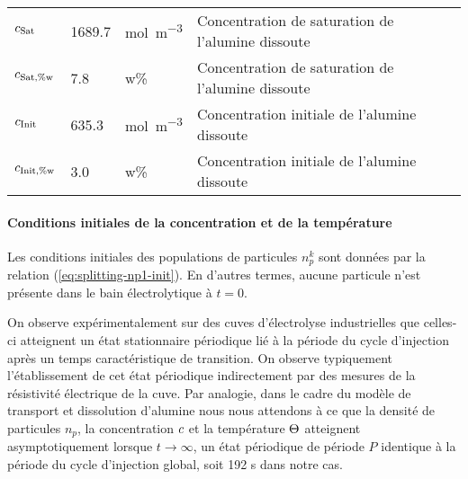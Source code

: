 \begin{table}
\begin{center}
\begin{tabularx}{\textwidth}{@{}lllX@{}}
      $c_\text{Sat}$                               & \num{1689.7}        & \si{\mol\per\cubic\meter}            & Concentration de saturation de l'alumine dissoute               \\
      $c_{\text{Sat},\%\mathrm w}$                             & \num{7.8}           & w\%                                  & Concentration de saturation de l'alumine dissoute               \\
      $c_\text{Init}$                              & \num{635.3}         & \si{\mol\per\cubic\meter}            & Concentration initiale de l'alumine dissoute                    \\
      $c_{\text{Init},\%\mathrm w}$                            & \num{3.0}           & w\%                                  & Concentration initiale de l'alumine dissoute                    \\
      \bottomrule
    \end{tabularx}
  \end{center}
\end{table}

\paragraph{Conditions initiales de la concentration et de la
  température} Les conditions initiales des populations de particules
$n_p^k$ sont données par la relation (\ref{eq:splitting-np1-init}). En
d'autres termes, aucune particule n'est présente dans le bain
électrolytique à $t = 0$.

On observe expérimentalement sur des cuves d'électrolyse industrielles
que celles-ci atteignent un état stationnaire périodique lié à la
période du cycle d'injection après un temps caractéristique de
transition. On observe typiquement l'établissement de cet état
périodique indirectement par des mesures de la résistivité électrique
de la cuve. Par analogie, dans le cadre du modèle de transport et
dissolution d'alumine nous nous attendons à ce que la densité de
particules $n_p$, la concentration $c$ et la température
$\Theta$ atteignent asymptotiquement lorsque $t\to\infty$, un
état périodique de période $P$ identique à la période du cycle
d'injection global, soit \num{192} \si{\second} dans notre cas.

